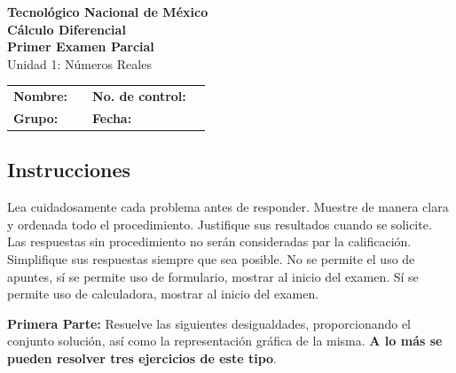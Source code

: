\documentclass[12pt]{article}
\newcommand{\institucion}{Tecnológico Nacional de México}
\newcommand{\materia}{Cálculo Diferencial}
\newcommand{\nombreexamen}{Primer Examen Parcial}
\newcommand{\unidad}{Unidad 1: Números Reales}
\newcounter{problema}
\begin{document}

\begin{center}
    {\Large\textbf{\institucion}}\\[0.3em]
    {\large\textbf{\materia}}\\[0.3em]
    {\large\textbf{\nombreexamen}}\\[0.3em]
    {\normalsize\unidad}
\end{center}

\vspace{0.05em}


\begin{tabularx}{\textwidth}{>{\bfseries}l X >{\bfseries}l X}
Nombre: & \hrulefill &
No. de control: & \hrulefill \\[1.2em]

Grupo: & \hrulefill &
Fecha: & \hrulefill \\[0.05em]

\end{tabularx}

\vspace{0.05em}



\subsection*{Instrucciones}
Lea cuidadosamente cada problema antes de responder. Muestre de manera clara y ordenada todo el procedimiento. Justifique sus resultados cuando se solicite. Las respuestas sin procedimiento no serán consideradas par la calificaci\'on. Simplifique sus respuestas siempre que sea posible. No se permite el uso de apuntes, sí se permite uso de formulario, mostrar al inicio del examen. Sí se permite uso de calculadora, mostrar al inicio del examen.

\textbf{Primera Parte:} Resuelve las siguientes desigualdades, proporcionando el conjunto  solución, así como la representación gráfica de  la misma. \textbf{A lo m\'as se pueden resolver tres ejercicios de este tipo}.
\end{document}
